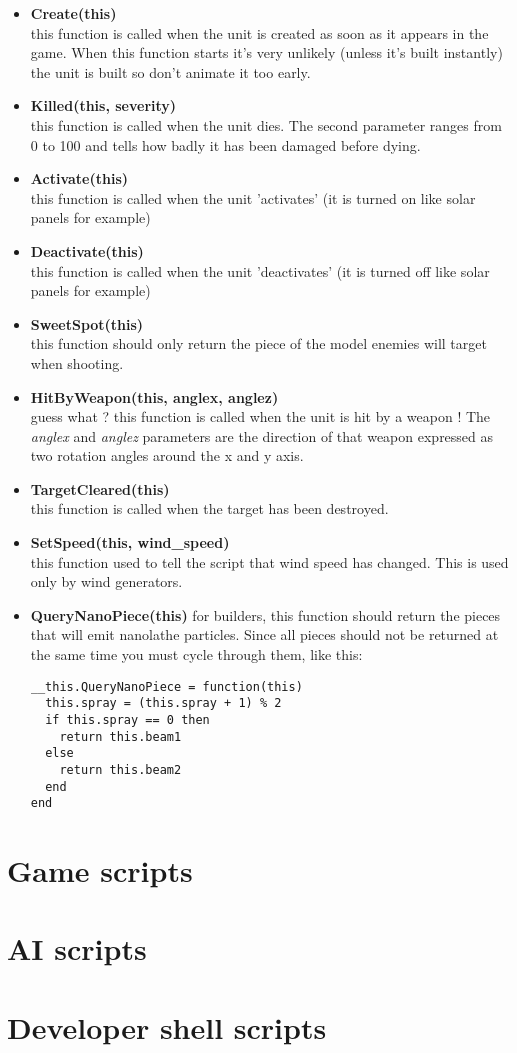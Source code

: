 \documentclass[a4paper,10pt]{article}
\begin{document}
\begin{itemize}
 \item \textbf{Create(this)}\\
  this function is called when the unit is created as soon as it appears in the game. When this function starts it's very unlikely (unless it's built instantly) the unit is built so don't animate it too early.

 \item \textbf{Killed(this, severity)}\\
  this function is called when the unit dies. The second parameter ranges from 0 to 100 and tells how badly it has been damaged before dying.

 \item \textbf{Activate(this)}\\
  this function is called when the unit 'activates' (it is turned on like solar panels for example)

 \item \textbf{Deactivate(this)}\\
  this function is called when the unit 'deactivates' (it is turned off like solar panels for example)

 \item \textbf{SweetSpot(this)}\\
  this function should only return the piece of the model enemies will target when shooting.

 \item \textbf{HitByWeapon(this, anglex, anglez)}\\
  guess what ? this function is called when the unit is hit by a weapon ! The \emph{anglex} and \emph{anglez} parameters are the direction of that weapon expressed as two rotation angles around the x and y axis.

 \item \textbf{TargetCleared(this)}\\
  this function is called when the target has been destroyed.

 \item \textbf{SetSpeed(this, wind\_speed)}\\
  this function used to tell the script that wind speed has changed. This is used only by wind generators.

 \item \textbf{QueryNanoPiece(this)}
  for builders, this function should return the pieces that will emit nanolathe particles. Since all pieces should not be returned at the same time you must cycle through them, like this:
  \begin{lstlisting}
__this.QueryNanoPiece = function(this)
  this.spray = (this.spray + 1) % 2
  if this.spray == 0 then
    return this.beam1
  else
    return this.beam2
  end
end
  \end{lstlisting}

\end{itemize}


\section{Game scripts}

\section{AI scripts}

\section{Developer shell scripts}
\end{document}
